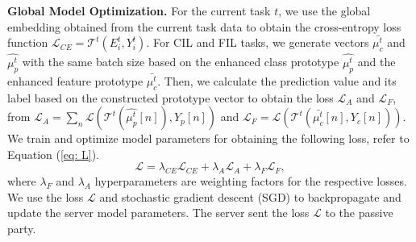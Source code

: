 \noindent\textbf{Global Model Optimization.}
For the current task $t$, we use the global embedding obtained from the current task data to obtain the cross-entropy loss function $\mathcal{L}_{CE} = \mathcal{T}^t(E_i^t, Y_i^t)$.
For CIL and FIL tasks, we generate vectors $\bar{\mu_{c}^t}$ and $\hat{\mu_{p}^t}$ with the same batch size based on the enhanced class prototype $\hat{\mu_{p}^t}$ and the enhanced feature prototype $\bar{\mu_{c}^t}$. 
Then, we calculate the prediction value and its label based on the constructed prototype vector to obtain the loss $\mathcal{L}_A$ and $\mathcal{L}_{F}$, from $\mathcal{L}_A = \sum_{n} \mathcal{L}(\mathcal{T}^t(\hat{\mu_{p}^t}[n]), Y_p[n])$ and $\mathcal{L}_{F} = \mathcal{L}(\mathcal{T}^t(\bar{\mu_{c}^t}[n], Y_c[n]))$.
We train and optimize model parameters for obtaining the following loss, refer to Equation (\ref{eq: L}).
\begin{equation} \label{eq: L}
  \mathcal{L} = \lambda_{CE} \mathcal{L}_{CE} + \lambda_A \mathcal{L}_A + \lambda_F \mathcal{L}_{F} ,
\end{equation}
where $\lambda_F$ and $\lambda_A$ hyperparameters are weighting factors for the respective losses. 
We use the loss $\mathcal{L}$ and stochastic gradient descent (SGD) \cite{malinovskiy2020local} to backpropagate and update the server model parameters.
The server sent the loss $\mathcal{L}$ to the passive party.




